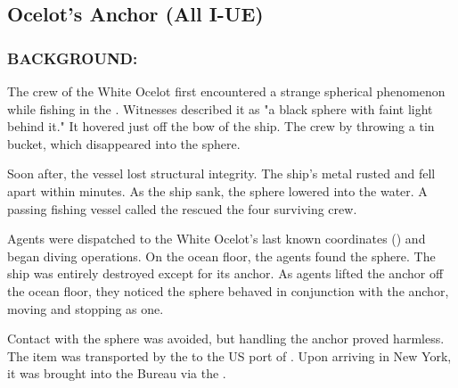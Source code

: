 \subsection*{Ocelot's Anchor (All I-UE)}
\subsubsection*{BACKGROUND:}
\par The crew of the White Ocelot first encountered a strange
spherical phenomenon while fishing in the .
Witnesses described it as "a black sphere with faint light behind
it." It hovered just off the bow of the ship. The crew 
by throwing a tin bucket, which
disappeared into the sphere.
\par Soon after, the vessel lost structural integrity. The ship's metal
rusted and fell apart within minutes. As the ship sank, the sphere
lowered into the water. A passing fishing vessel called the 
rescued the four surviving crew.
\par Agents were dispatched to the White Ocelot's last known
coordinates () and began diving
operations. On the ocean floor, the agents found the sphere. The
ship was entirely destroyed except for its anchor. As agents lifted
the anchor off the ocean floor, they noticed the sphere behaved in
conjunction with the anchor, moving and stopping as one.
\par Contact with the sphere was avoided, but handling the anchor
proved harmless. The item was transported by the 
to the US port of . Upon arriving in New York, it was
brought into the Bureau via the .
